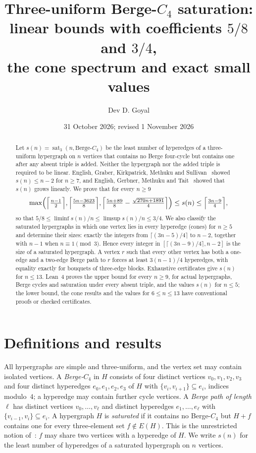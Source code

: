 \documentclass[11pt]{article}
\title{\textbf{Three-uniform Berge-$C_4$ saturation:\\ linear bounds with coefficients $5/8$ and $3/4$,\\ the cone spectrum and exact small values}}
\author{Dev D. Goyal}
\date{31 October 2026; revised 1 November 2026}
\theoremstyle{remark}
\newcommand{\sat}{\operatorname{sat}}
\begin{document}
\maketitle
\begin{abstract}
Let $s(n)=\sat_3(n,\text{Berge-}C_4)$ be the least number of hyperedges of
a three-uniform hypergraph on $n$ vertices that contains no Berge
four-cycle but contains one after any absent triple is added. Neither the
hypergraph nor the added triple is required to be linear. English,
Graber, Kirkpatrick, Methuku and Sullivan~\cite{EGKMS} showed $s(n)\le n-2$
for $n\ge7$, and English, Gerbner, Methuku and Tait~\cite{EGMT} showed that
$s(n)$ grows linearly. We prove that for every $n\ge9$
\[
\max\Bigl(\Bigl\lceil\tfrac{n-1}{2}\Bigr\rceil,\Bigl\lceil\tfrac{5n-3623}{8}\Bigr\rceil,
\Bigl\lceil\tfrac{5n+89}{8}-\tfrac{\sqrt{270n+1891}}{4}\Bigr\rceil\Bigr)
\le s(n)\le\Bigl\lceil\tfrac{3n-9}{4}\Bigr\rceil ,
\]
so that $5/8\le\liminf s(n)/n\le\limsup s(n)/n\le3/4$. We also classify
the saturated hypergraphs in which one vertex lies in every hyperedge
(cones) for $n\ge5$ and determine their sizes: exactly the integers from
$\lceil(3n-5)/4\rceil$ to $n-2$, together with $n-1$ when $n\equiv1\pmod
3$. Hence every integer in $[\lceil(3n-9)/4\rceil,n-2]$ is the size of a
saturated hypergraph. A vertex $r$ such that every other vertex has both
a one-edge and a two-edge Berge path to $r$ forces at least $3(n-1)/4$
hyperedges, with equality exactly for bouquets of three-edge blocks.
Exhaustive certificates give $s(n)$ for $n\le13$. Lean~4 proves the upper
bound for every $n\ge9$, for actual hypergraphs, Berge cycles and
saturation under every absent triple, and the values $s(n)$ for $n\le5$;
the lower bound, the cone results and the values for $6\le n\le13$ have
conventional proofs or checked certificates.
\end{abstract}

\section{Definitions and results}

All hypergraphs are simple and three-uniform, and the vertex set may
contain isolated vertices. A \emph{Berge-$C_4$} in $H$ consists of four
distinct vertices $v_0,v_1,v_2,v_3$ and four distinct hyperedges
$e_0,e_1,e_2,e_3$ of $H$ with $\{v_i,v_{i+1}\}\subseteq e_i$, indices
modulo~$4$; a hyperedge may contain further cycle vertices. A \emph{Berge
path of length $\ell$} has distinct vertices $v_0,\dots,v_\ell$ and
distinct hyperedges $e_1,\dots,e_\ell$ with $\{v_{i-1},v_i\}\subseteq e_i$.
A hypergraph $H$ is \emph{saturated} if it contains no Berge-$C_4$ but
$H+f$ contains one for every three-element set $f\notin E(H)$. This is
the unrestricted notion of~\cite{EGKMS}: $f$ may share two vertices with
a hyperedge of $H$. We write $s(n)$ for the least number of hyperedges of
a saturated hypergraph on $n$ vertices.
\end{document}
